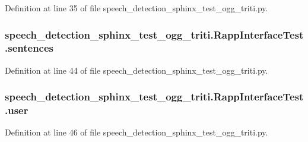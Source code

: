 Definition at line 35 of file speech\-\_\-detection\-\_\-sphinx\-\_\-test\-\_\-ogg\-\_\-triti.\-py.

\hypertarget{classspeech__detection__sphinx__test__ogg__triti_1_1RappInterfaceTest_a308ec870554c450147d601a3a226205a}{
\subsubsection[{sentences}]{\setlength{\rightskip}{0pt plus 5cm}speech\-\_\-detection\-\_\-sphinx\-\_\-test\-\_\-ogg\-\_\-triti.\-Rapp\-Interface\-Test.\-sentences}}\label{classspeech__detection__sphinx__test__ogg__triti_1_1RappInterfaceTest_a308ec870554c450147d601a3a226205a}


Definition at line 44 of file speech\-\_\-detection\-\_\-sphinx\-\_\-test\-\_\-ogg\-\_\-triti.\-py.

\hypertarget{classspeech__detection__sphinx__test__ogg__triti_1_1RappInterfaceTest_a1a408421731507ad94724de6b9a46ac6}{
\subsubsection[{user}]{\setlength{\rightskip}{0pt plus 5cm}speech\-\_\-detection\-\_\-sphinx\-\_\-test\-\_\-ogg\-\_\-triti.\-Rapp\-Interface\-Test.\-user}}\label{classspeech__detection__sphinx__test__ogg__triti_1_1RappInterfaceTest_a1a408421731507ad94724de6b9a46ac6}


Definition at line 46 of file speech\-\_\-detection\-\_\-sphinx\-\_\-test\-\_\-ogg\-\_\-triti.\-py.

